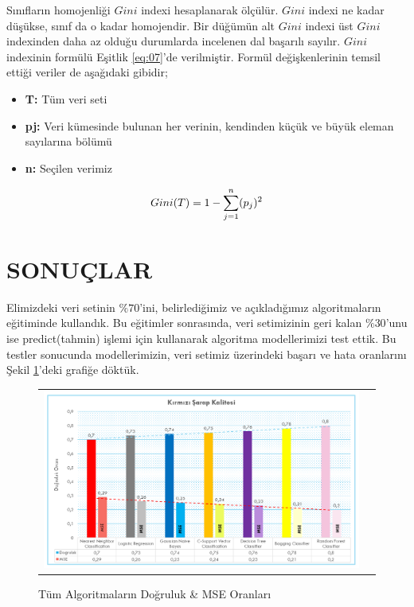 \documentclass[conference]{IEEEtran}
\begin{document}
\quad Sınıfların homojenliği $Gini$ indexi hesaplanarak ölçülür. $Gini$ indexi ne kadar düşükse, sınıf da o kadar homojendir. Bir düğümün alt $Gini$ indexi üst $Gini$ indexinden daha az olduğu durumlarda incelenen dal başarılı sayılır\cite{21}. $Gini$ indexinin formülü Eşitlik \ref{eq:07}'de verilmiştir. Formül değişkenlerinin temsil ettiği veriler de aşağıdaki gibidir;

\begin{itemize}
\item \textbf{T:} Tüm veri seti
\item \textbf{pj:} Veri kümesinde bulunan her verinin, kendinden küçük ve büyük eleman sayılarına bölümü
\item \textbf{n:} Seçilen verimiz
\end{itemize}

\begin{equation}
\label{eq:07}
\Large Gini(T)=1-\sum_{j=1}^{n}(p_{j})^{2}
\end{equation}

\pagebreak
\section{\textbf{SONUÇLAR}}

\quad Elimizdeki veri setinin $\%70$'ini, belirlediğimiz ve açıkladığımız algoritmaların eğitiminde kullandık. Bu eğitimler sonrasında, veri setimizinin geri kalan $\%30$'unu ise predict(tahmin) işlemi için kullanarak algoritma modellerimizi test ettik. Bu testler sonucunda modellerimizin, veri setimiz üzerindeki başarı ve hata oranlarını Şekil \ref{fig:08}'deki grafiğe döktük.

\begin{figure}[!h]
	\centering
	\begin{center}
		\begin{tabular}{cc}
			\includegraphics[scale=0.325]{pictures/pic_08.png}&
		\end{tabular}
	\end{center}
	\caption{Tüm Algoritmaların Doğruluk \& MSE Oranları}
	\label{fig:08}
\end{figure}
\end{document}
